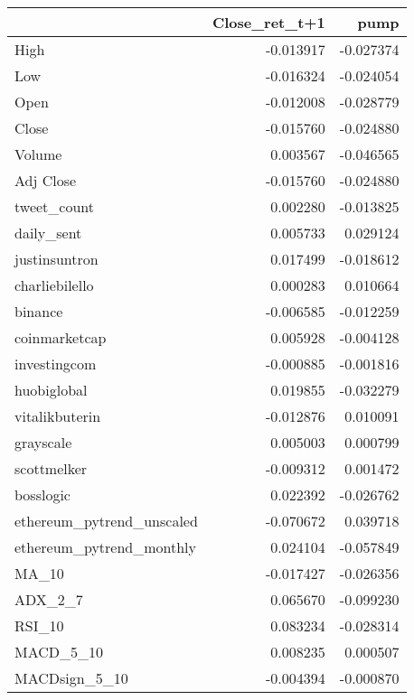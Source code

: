 \begin{tabular}{lrr}
\toprule
{} &  Close\_ret\_t+1 &      pump \\
\midrule
High                      &      -0.013917 & -0.027374 \\
Low                       &      -0.016324 & -0.024054 \\
Open                      &      -0.012008 & -0.028779 \\
Close                     &      -0.015760 & -0.024880 \\
Volume                    &       0.003567 & -0.046565 \\
Adj Close                 &      -0.015760 & -0.024880 \\
tweet\_count               &       0.002280 & -0.013825 \\
daily\_sent                &       0.005733 &  0.029124 \\
justinsuntron             &       0.017499 & -0.018612 \\
charliebilello            &       0.000283 &  0.010664 \\
binance                   &      -0.006585 & -0.012259 \\
coinmarketcap             &       0.005928 & -0.004128 \\
investingcom              &      -0.000885 & -0.001816 \\
huobiglobal               &       0.019855 & -0.032279 \\
vitalikbuterin            &      -0.012876 &  0.010091 \\
grayscale                 &       0.005003 &  0.000799 \\
scottmelker               &      -0.009312 &  0.001472 \\
bosslogic                 &       0.022392 & -0.026762 \\
ethereum\_pytrend\_unscaled &      -0.070672 &  0.039718 \\
ethereum\_pytrend\_monthly  &       0.024104 & -0.057849 \\
MA\_10                     &      -0.017427 & -0.026356 \\
ADX\_2\_7                   &       0.065670 & -0.099230 \\
RSI\_10                    &       0.083234 & -0.028314 \\
MACD\_5\_10                 &       0.008235 &  0.000507 \\
MACDsign\_5\_10             &      -0.004394 & -0.000870 \\

\end{tabular}
